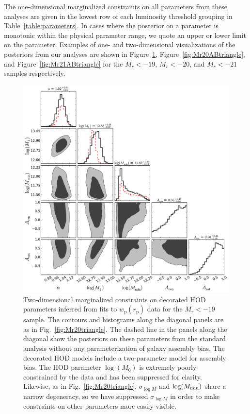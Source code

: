 \documentclass[usenatbib,usegraphicx,letterpaper]{mn2e}
\newcommand{\wprp}{w_{\mathrm{p}}}
\newcommand{\rp}{r_{\mathrm{p}}}
\begin{document}
The one-dimensional marginalized constraints on all parameters from these analyses
are given in the lowest row of each luminosity threshold grouping in Table~\ref{table:parameters}.
In cases where the posterior on a parameter is monotonic within the physical parameter
range, we quote an upper or lower limit on the parameter. Examples of one- and two-dimensional
visualizations of the posteriors from our analyses are shown in Figure~\ref{fig:Mr19ABtriangle},
Figure~\ref{fig:Mr20ABtriangle}, and Figure~\ref{fig:Mr21ABtriangle} for the
$M_r<-19$, $M_r<-20$, and $M_r<-21$ samples respectively.


\begin{figure}
\begin{center}
\includegraphics[width=15.0cm]{Mr19ABTri.pdf}
\caption{ Two-dimensional marginalized constraints on decorated HOD
  parameters inferred from fits to $\wprp(\rp)$ data for the $M_r<-19$
  sample. The contours and histograms along the diagonal panels are as
  in Fig.~\ref{fig:Mr20triangle}. The dashed line in the panels along the diagonal
  show the posteriors on these parameters from the standard analysis without
  any parameterization of galaxy assembly bias. The decorated HOD models include a
  two-parameter model for assembly bias. The HOD parameter $\log
  (M_0)$ is extremely poorly constrained by the data and has been
  suppressed for clarity. Likewise, as in Fig.~\ref{fig:Mr20triangle},
  $\sigma_{\log M}$ and $\log (M_{\rm min})$ share a narrow
  degeneracy, so we have suppressed $\sigma_{\log M}$ in order to make
  constraints on other parameters more easily visible.  }
\label{fig:Mr19ABtriangle}
\end{center}
\end{figure}
\end{document}
